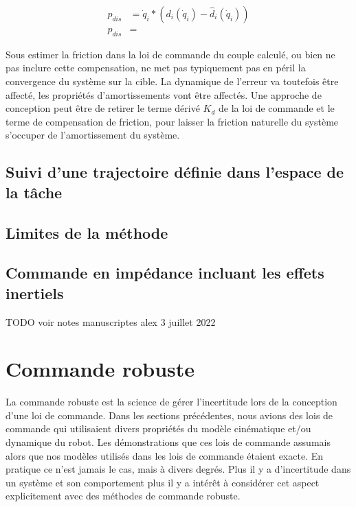 \begin{align}
p_{dis} &= \dot{q}_i * ( d_i(\dot{q}_i) - \hat{d}_i(\dot{q}_i) ) \\
p_{dis} &= 
\end{align}

Sous estimer la friction dans la loi de commande du couple calculé, ou bien ne pas inclure cette compensation, ne met pas typiquement pas en péril la convergence du système sur la cible. La dynamique de l'erreur va toutefois être affecté, les propriétés d'amortissements vont être affectés. Une approche de conception peut être de retirer le terme dérivé $K_d$ de la loi de commande et le terme de compensation de friction, pour laisser la friction naturelle du système s'occuper de l'amortissement du système.  



\subsection{Suivi d'une trajectoire définie dans l'espace de la tâche}


\subsection{Limites de la méthode}


\subsection{Commande en impédance incluant les effets inertiels }

TODO voir notes manuscriptes alex 3 juillet 2022

\newpage
\section{Commande robuste}

La commande robuste est la science de gérer l'incertitude lors de la conception d'une loi de commande. Dans les sections précédentes, nous avions des lois de commande qui utilisaient divers propriétés du modèle cinématique et/ou dynamique du robot. Les démonstrations que ces lois de commande assumais alors que nos modèles utilisés dans les lois de commande étaient exacte. En pratique ce n'est jamais le cas, mais à divers degrés. Plus il y a d'incertitude dans un système et son comportement plus il y a intérêt à considérer cet aspect explicitement avec des méthodes de commande robuste.

